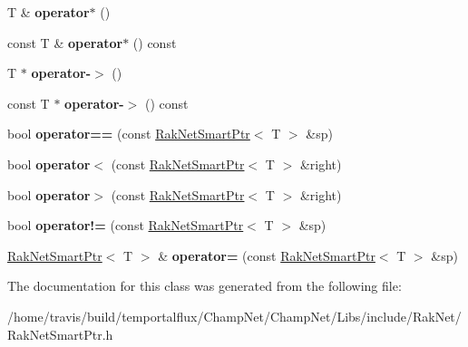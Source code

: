 \begin{DoxyCompactItemize}
\item 
\hypertarget{class_rak_net_1_1_rak_net_smart_ptr_a4fe06d5c41b29074ec9831dde079a1f8}{T \& {\bfseries operator$\ast$} ()}\label{class_rak_net_1_1_rak_net_smart_ptr_a4fe06d5c41b29074ec9831dde079a1f8}

\item 
\hypertarget{class_rak_net_1_1_rak_net_smart_ptr_ab153bbc49fd5c299073f171886754228}{const T \& {\bfseries operator$\ast$} () const }\label{class_rak_net_1_1_rak_net_smart_ptr_ab153bbc49fd5c299073f171886754228}

\item 
\hypertarget{class_rak_net_1_1_rak_net_smart_ptr_acbcc23088595ac4fb11125e0c4b91625}{T $\ast$ {\bfseries operator-\/$>$} ()}\label{class_rak_net_1_1_rak_net_smart_ptr_acbcc23088595ac4fb11125e0c4b91625}

\item 
\hypertarget{class_rak_net_1_1_rak_net_smart_ptr_a626626dc3f812f5de96aab69d63be8d9}{const T $\ast$ {\bfseries operator-\/$>$} () const }\label{class_rak_net_1_1_rak_net_smart_ptr_a626626dc3f812f5de96aab69d63be8d9}

\item 
\hypertarget{class_rak_net_1_1_rak_net_smart_ptr_ad10583ad7696faae1053b2694bbbd6a5}{bool {\bfseries operator==} (const \hyperlink{class_rak_net_1_1_rak_net_smart_ptr}{Rak\-Net\-Smart\-Ptr}$<$ T $>$ \&sp)}\label{class_rak_net_1_1_rak_net_smart_ptr_ad10583ad7696faae1053b2694bbbd6a5}

\item 
\hypertarget{class_rak_net_1_1_rak_net_smart_ptr_aec6fe90c7470b5fd3eb899a748890f11}{bool {\bfseries operator$<$} (const \hyperlink{class_rak_net_1_1_rak_net_smart_ptr}{Rak\-Net\-Smart\-Ptr}$<$ T $>$ \&right)}\label{class_rak_net_1_1_rak_net_smart_ptr_aec6fe90c7470b5fd3eb899a748890f11}

\item 
\hypertarget{class_rak_net_1_1_rak_net_smart_ptr_a6dcec36306127038d0f2229e3eb352fd}{bool {\bfseries operator$>$} (const \hyperlink{class_rak_net_1_1_rak_net_smart_ptr}{Rak\-Net\-Smart\-Ptr}$<$ T $>$ \&right)}\label{class_rak_net_1_1_rak_net_smart_ptr_a6dcec36306127038d0f2229e3eb352fd}

\item 
\hypertarget{class_rak_net_1_1_rak_net_smart_ptr_a3def7b4525d7ca0c128b6cf6a434fd97}{bool {\bfseries operator!=} (const \hyperlink{class_rak_net_1_1_rak_net_smart_ptr}{Rak\-Net\-Smart\-Ptr}$<$ T $>$ \&sp)}\label{class_rak_net_1_1_rak_net_smart_ptr_a3def7b4525d7ca0c128b6cf6a434fd97}

\item 
\hypertarget{class_rak_net_1_1_rak_net_smart_ptr_a361dfebbc881aebfd70531d0d955491c}{\hyperlink{class_rak_net_1_1_rak_net_smart_ptr}{Rak\-Net\-Smart\-Ptr}$<$ T $>$ \& {\bfseries operator=} (const \hyperlink{class_rak_net_1_1_rak_net_smart_ptr}{Rak\-Net\-Smart\-Ptr}$<$ T $>$ \&sp)}\label{class_rak_net_1_1_rak_net_smart_ptr_a361dfebbc881aebfd70531d0d955491c}

\end{DoxyCompactItemize}


The documentation for this class was generated from the following file\-:\begin{DoxyCompactItemize}
\item 
/home/travis/build/temportalflux/\-Champ\-Net/\-Champ\-Net/\-Libs/include/\-Rak\-Net/Rak\-Net\-Smart\-Ptr.\-h\end{DoxyCompactItemize}
